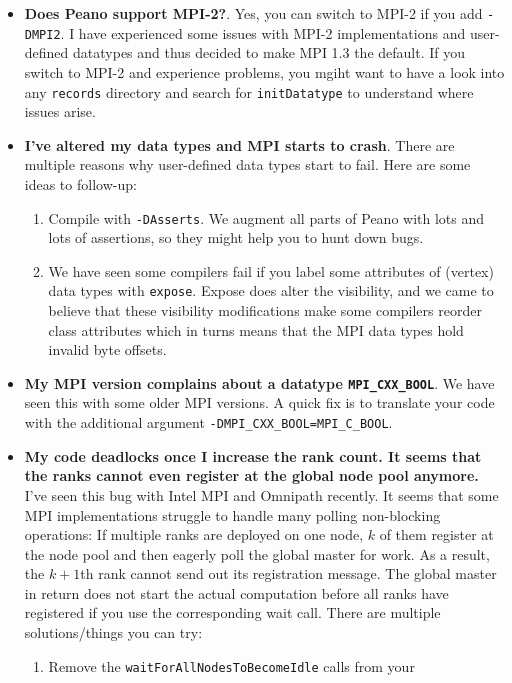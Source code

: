 \begin{itemize}
  \item \textbf{ Does Peano support MPI-2?}. Yes, you can switch to MPI-2 if you
  add \texttt{-DMPI2}. I have experienced some issues with MPI-2 implementations and
  user-defined datatypes and thus decided to make MPI 1.3 the default. If you
  switch to MPI-2 and experience problems, you  mgiht want to have a look into
  any \texttt{records} directory and search for \texttt{initDatatype} to
  understand where issues arise.
  \item \textbf{ I've altered my data types and MPI starts to crash}. There are
  multiple reasons why user-defined data types start to fail. Here are some
  ideas to follow-up:
    \begin{enumerate}
      \item Compile with \texttt{-DAsserts}. We augment all parts of Peano with
      lots and lots of assertions, so they might help you to hunt down bugs.
      \item We have seen some compilers fail if you label some attributes of
      (vertex) data types with \texttt{expose}. Expose does alter the
      visibility, and we came to believe that these visibility modifications
      make some compilers reorder class attributes which in turns means that the
      MPI data types hold invalid byte offsets.
    \end{enumerate}
  \item \textbf{ My MPI version complains about a datatype
  \texttt{MPI\_CXX\_BOOL}}.
    We have seen this with some older MPI versions. A quick fix is to translate
    your code with the additional argument
    \texttt{-DMPI\_CXX\_BOOL=MPI\_C\_BOOL}.
  \item \textbf{ My code deadlocks once I increase the rank count. It seems that
    the ranks cannot even register at the global node pool anymore.}
    I've seen this bug with Intel MPI and Omnipath recently. It seems that some
    MPI implementations struggle to handle many polling non-blocking operations:
    If multiple ranks are deployed on one node, $k$ of them register at the node
    pool and then eagerly poll the global master for work. As a result, the
    $k+1$th rank cannot send out its registration message. The global master in
    return does not start the actual computation before all ranks have
    registered if you use the corresponding wait call. There are multiple
    solutions/things you can try:
    \begin{enumerate}
      \item Remove the \texttt{waitForAllNodesToBecomeIdle} calls from your

\end{enumerate}
\end{itemize}
